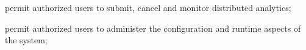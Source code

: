 \begin{description}
  \item permit authorized users to submit, cancel and monitor distributed analytics;
  \item permit authorized users to administer the configuration and runtime aspects of the system;
\end{description}        